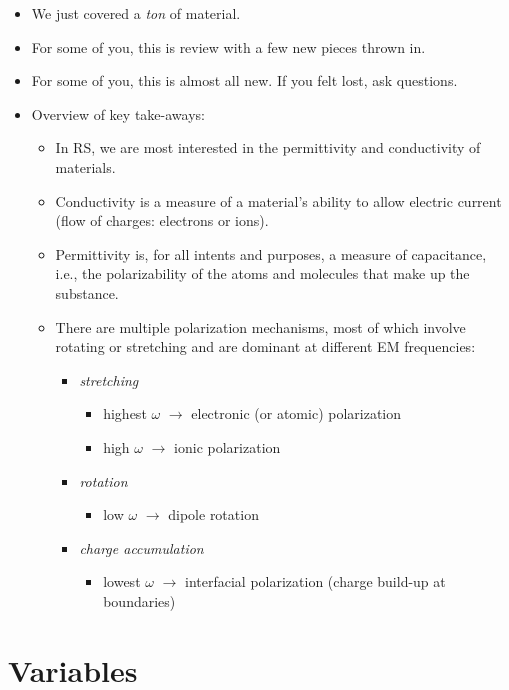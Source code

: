 \documentclass[11pt, oneside]{article}
\begin{document}
\begin{itemize}
	\item We just covered a \emph{ton} of material.
	\item For some of you, this is review with a few new pieces thrown in.
	\item For some of you, this is almost all new. If you felt lost, ask questions.
	\item Overview of key take-aways:
	\begin{itemize}
		\item In RS, we are most interested in the permittivity and conductivity of materials.
		\item Conductivity is a measure of a material's ability to allow electric current (flow of charges: electrons or ions).
		\item Permittivity is, for all intents and purposes, a measure of capacitance, i.e., the polarizability of the atoms and molecules that make up the substance.
		\item There are multiple polarization mechanisms, most of which involve rotating or stretching and are dominant at different EM frequencies:
		\begin{itemize}
			\item \emph{stretching}
			\begin{itemize}
				\item highest $\omega$ $\rightarrow$ electronic (or atomic) polarization
				\item high $\omega$ $\rightarrow$ ionic polarization
			\end{itemize}
			\item \emph{rotation}
			\begin{itemize}
				\item low $\omega$ $\rightarrow$ dipole rotation
			\end{itemize}
			\item \emph{charge accumulation}
			\begin{itemize}
				\item lowest $\omega$ $\rightarrow$ interfacial polarization (charge build-up at boundaries)
			\end{itemize}
		\end{itemize}
	\end{itemize}
\end{itemize}

\section*{Variables}
\end{document}
